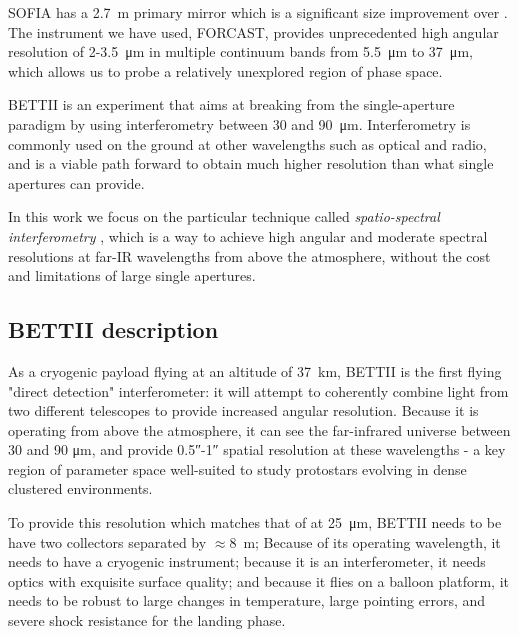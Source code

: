 SOFIA has a \SI{2.7}{\meter} primary mirror which is a significant size improvement over \Spitzer. The instrument we have used, FORCAST, provides unprecedented high angular resolution of 2-3.5~\si{\micro\meter} in multiple continuum bands from \SI{5.5}{\micro\meter} to \SI{37}{\micro\meter}, which allows us to probe a relatively unexplored region of phase space.

BETTII is an experiment that aims at breaking from the single-aperture paradigm by using interferometry between 30 and \SI{90}{\micro\meter}. Interferometry is commonly used on the ground at other wavelengths such as optical and radio, and is a viable path forward to obtain much higher resolution than what single apertures can provide. 

In this work we focus on the particular technique called \textit{spatio-spectral interferometry} \citep{Mariotti:1988vea}, which is a way to achieve 
high angular and moderate spectral resolutions at far-IR wavelengths from above the atmosphere, without the cost and limitations of large single apertures. 


\subsection{BETTII description}

As a cryogenic payload flying at an altitude of \SI{37}{\kilo\meter}, BETTII is the first flying "direct detection" interferometer: it will attempt to coherently combine light from two different telescopes to provide increased angular resolution. Because it is operating from above the atmosphere, it can see the far-infrared universe between 30 and 90 \si{\micro\meter}, and provide \ang{;;0.5}-\ang{;;1} spatial resolution at these wavelengths - a key region of parameter space well-suited to study protostars evolving in dense clustered environments.

To provide this resolution which matches that of \JWST  at \SI{25}{\micro\meter}, BETTII needs to be have two collectors separated by $\approx$\SI{8}{\meter}; Because of its operating wavelength, it needs to have a cryogenic instrument; because it is an interferometer, it needs optics with exquisite surface quality; and because it flies on a balloon platform, it needs to be robust to large changes in temperature, large pointing errors, and severe shock resistance for the landing phase.

